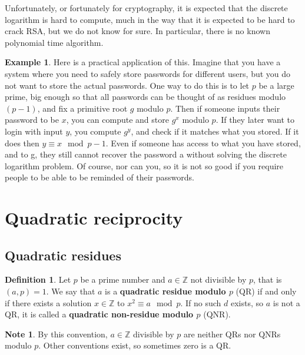 \documentclass{article}
\newcommand{\Z}{\mathbb{Z}}
\newcommand{\rb}[1]{\left( #1 \right)}
\theoremstyle{definition}\newtheorem{definition}{Definition}
\theoremstyle{definition}\newtheorem{remark}[definition]{Remark}
\theoremstyle{definition}\newtheorem*{example}{Example}
\theoremstyle{definition}\newtheorem*{note}{Note}
\begin{document}
Unfortunately, or fortunately for cryptography, it is expected that the discrete logarithm is hard to compute, much in the way that it is expected to be hard to crack RSA, but we do not know for sure. In particular, there is no known polynomial time algorithm.

\begin{example}
Here is a practical application of this. Imagine that you have a system where you need to safely store passwords for different users, but you do not want to store the actual passwords. One way to do this is to let $ p $ be a large prime, big enough so that all passwords can be thought of as residues modulo $ \rb{p - 1} $, and fix a primitive root $ g $ modulo $ p $. Then if someone inputs their password to be $ x $, you can compute and store $ g^x $ modulo $ p $. If they later want to login with input $ y $, you compute $ g^y $, and check if it matches what you stored. If it does then $ y \equiv x \mod p - 1 $. Even if someone has access to what you have stored, and to g, they still cannot recover the password a without solving the discrete logarithm problem. Of
course, nor can you, so it is not so good if you require people to be able to
be reminded of their passwords.
\end{example}

\section{Quadratic reciprocity}

\subsection{Quadratic residues}

\begin{definition}
Let $ p $ be a prime number and $ a \in \Z $ not divisible by $ p $, that is $ \rb{a, p} = 1 $. We say that $ a $ is a \textbf{quadratic residue modulo $ p $} (QR) if and only if there exists a solution $ x \in \Z $ to $ x^2 \equiv a \mod p $. If no such $ d $ exists, so $ a $ is not a QR, it is called a \textbf{quadratic non-residue modulo $ p $} (QNR).
\end{definition}

\begin{note}
By this convention, $ a \in \Z $ divisible by $ p $ are neither QRs nor QNRs modulo $ p $. Other conventions exist, so sometimes zero is a QR.
\end{note}
\end{document}
